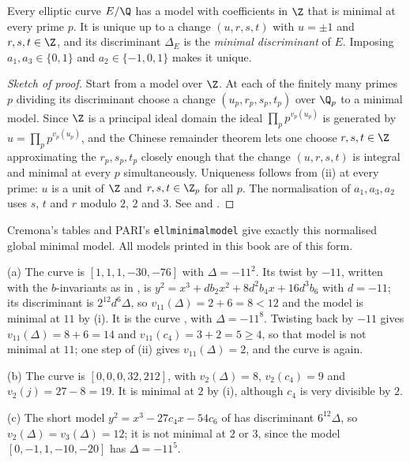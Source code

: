 \begin{theorem}\label{thm:reduction:global-minimal}
Every elliptic curve $E/\Q$ has a model with coefficients in $\Z$ that is minimal at every prime $p$. It is
unique up to a change $(u,r,s,t)$ with $u=\pm1$ and $r,s,t\in\Z$, and its discriminant $\Delta_E$ is the
\emph{minimal discriminant} of $E$. Imposing $a_1,a_3\in\{0,1\}$ and $a_2\in\{-1,0,1\}$ makes it unique.
\end{theorem}

\begin{proof}[Sketch of proof]
Start from a model over $\Z$. At each of the finitely many primes $p$ dividing its discriminant choose a
change $(u_p,r_p,s_p,t_p)$ over $\Q_p$ to a minimal model. Since $\Z$ is a principal ideal domain the ideal
$\prod_pp^{v_p(u_p)}$ is generated by $u=\prod_pp^{v_p(u_p)}$, and the Chinese remainder theorem lets one choose
$r,s,t\in\Z$ approximating the $r_p,s_p,t_p$ closely enough that the change $(u,r,s,t)$ is integral and
minimal at every $p$ simultaneously. Uniqueness follows from
(ii) at every prime: $u$ is a unit of $\Z$ and $r,s,t\in\Z_p$ for all $p$.
The normalisation of $a_1,a_3,a_2$ uses $s$, $t$ and $r$ modulo $2$, $2$ and $3$. See
\cite[VIII.8]{SilvermanAEC} and \cite[Section 3.2]{Cremona97}.
\end{proof}

Cremona's tables \cite{Cremona97,ecdata} and PARI's \texttt{ellminimalmodel} give exactly this normalised
global minimal model. All models printed in this book are of this form.

\begin{example}\label{ex:reduction:minimal-examples}
(a) The curve  is $[1,1,1,-30,-76]$ with $\Delta=-11^2$. Its twist by $-11$, written with the
$b$-invariants as in , is $y^2=x^3+db_2x^2+8d^2b_4x+16d^3b_6$ with $d=-11$; its discriminant
is $2^{12}d^6\Delta$, so $v_{11}(\Delta)=2+6=8<12$ and the model is minimal at $11$ by
(i). It is the curve , with $\Delta=-11^8$. Twisting
 back by $-11$ gives $v_{11}(\Delta)=8+6=14$ and $v_{11}(c_4)=3+2=5\ge4$, so that model is not
minimal at $11$; one step of (ii) gives $v_{11}(\Delta)=2$, and the curve is
 again.

(b) The curve  is $[0,0,0,32,212]$, with $v_2(\Delta)=8$, $v_2(c_4)=9$ and $v_2(j)=27-8=19$. It is
minimal at $2$ by (i), although $c_4$ is very divisible by $2$.

(c) The short model $y^2=x^3-27c_4x-54c_6$ of  has discriminant $6^{12}\Delta$, so
$v_2(\Delta)=v_3(\Delta)=12$; it is not minimal at $2$ or $3$, since the model $[0,-1,1,-10,-20]$ has
$\Delta=-11^5$.
\end{example}

